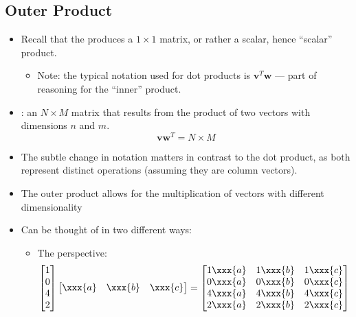 \begin{itemize}
  \subsection{Outer Product}\label{Outer Product}
  \begin{itemize}
    \item Recall that the \hyperref[Dot (scalar, inner) product]{} produces a \(1\times1 \) matrix, or rather a scalar, hence ``scalar'' product.
      \begin{itemize}
        \item Note: the typical notation used for dot products is \(\bm{v}^T \bm{w}\) --- part of reasoning for the ``inner'' product. 
      \end{itemize}
    \item {}: an \(N\times M\) matrix that results from the product of two vectors with dimensions \(n\) and \(m\).
    \[%
    \bm{v}\bm{w}^T=N\times M
    \]%
    \item The subtle change in notation matters in contrast to the dot product, as both represent distinct operations (assuming they are column vectors).
    \item The outer product allows for the multiplication of vectors with different dimensionality
    \item Can be thought of in two different ways:
    \begin{itemize}
      \item The  perspective:
      \[%
      \begin{bmatrix}
        1 \\
        0 \\
        4 \\
        2
      \end{bmatrix} \begin{bmatrix} \xxx{a} & \xxx{b} & \xxx{c} \end{bmatrix}
      =
      \begin{bmatrix}
        1\xxx{a} & 1\xxx{b} & 1\xxx{c} \\
        0\xxx{a} & 0\xxx{b} & 0\xxx{c} \\
        4\xxx{a} & 4\xxx{b} & 4\xxx{c} \\
        2\xxx{a} & 2\xxx{b} & 2\xxx{c}  
      \end{bmatrix}
      \]%

\end{itemize}
\end{itemize}
\end{itemize}
